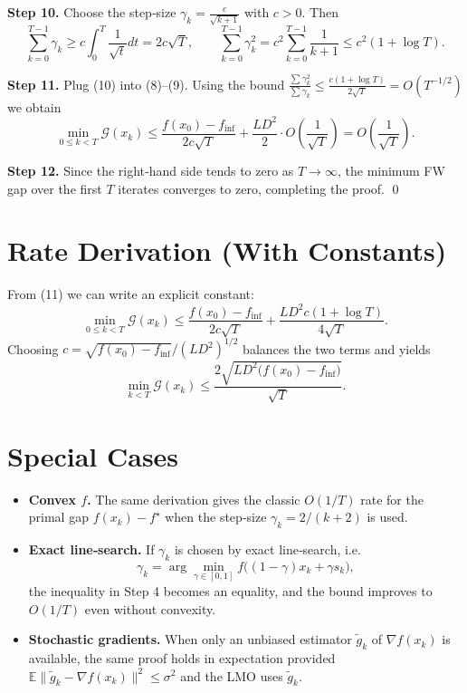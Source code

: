 \documentclass{article}
\newcommand{\gap}{\mathcal{G}}
\begin{document}
\noindent\textbf{Step 10.} Choose the step‑size $\gamma_k = \frac{c}{\sqrt{k+1}}$ with $c>0$.
Then
\[
\sum_{k=0}^{T-1}\gamma_k 
   \ge c\int_{0}^{T}\frac{1}{\sqrt{t}}dt = 2c\sqrt{T},
\qquad
\sum_{k=0}^{T-1}\gamma_k^2 
   = c^2\sum_{k=0}^{T-1}\frac{1}{k+1}
   \le c^2(1+\log T) .
\tag{10}
\]

\noindent\textbf{Step 11.} Plug (10) into (8)–(9). Using the bound $\frac{\sum\gamma_k^2}{\sum\gamma_k}\le \frac{c(1+\log T)}{2\sqrt{T}}=O(T^{-1/2})$ we obtain
\[
\min_{0\le k<T}\gap(x_k)
   \le \frac{f(x_0)-f_{\inf}}{2c\sqrt{T}}
      + \frac{L D^2}{2}\cdot O\!\left(\frac{1}{\sqrt{T}}\right)
   = O\!\left(\frac{1}{\sqrt{T}}\right) .
\tag{11}
\]

\noindent\textbf{Step 12.} Since the right‑hand side tends to zero as $T\to\infty$, the minimum FW gap over the first $T$ iterates converges to zero, completing the proof. \qed

\section*{Rate Derivation (With Constants)}
From (11) we can write an explicit constant:
\[
\min_{0\le k<T}\gap(x_k)
   \le \frac{f(x_0)-f_{\inf}}{2c\sqrt{T}}
      + \frac{L D^2 c(1+\log T)}{4\sqrt{T}} .
\]
Choosing $c = \sqrt{f(x_0)-f_{\inf}}/(L D^2)^{1/2}$ balances the two terms and yields
\[
\min_{k<T}\gap(x_k) \le \frac{2\sqrt{L D^2\big(f(x_0)-f_{\inf}\big)}}{\sqrt{T}} .
\]

\section*{Special Cases}
\begin{itemize}
\item \textbf{Convex $f$.} The same derivation gives the classic $O(1/T)$ rate for the primal gap $f(x_k)-f^\star$ when the step‑size $\gamma_k=2/(k+2)$ is used.
\item \textbf{Exact line‑search.} If $\gamma_k$ is chosen by exact line‑search, i.e. 
\[
\gamma_k = \arg\min_{\gamma\in[0,1]} f\big((1-\gamma)x_k+\gamma s_k\big),
\]
the inequality in Step 4 becomes an equality, and the bound improves to $O(1/T)$ even without convexity.
\item \textbf{Stochastic gradients.} When only an unbiased estimator $\tilde g_k$ of $\nabla f(x_k)$ is available, the same proof holds in expectation provided $\mathbb{E}\|\tilde g_k-\nabla f(x_k)\|^2\le\sigma^2$ and the LMO uses $\tilde g_k$.
\end{itemize}
\end{document}
